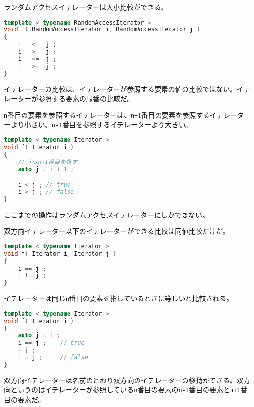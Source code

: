 ランダムアクセスイテレーターは大小比較ができる。

\begin{lstlisting}[language={C++}]
template < typename RandomAccessIterator >
void f( RandomAccessIterator i, RandomAccessIterator j )
{
    i   <   j ;
    i   >   j ;
    i   <=  j ;
    i   >=  j ;
}
\end{lstlisting}

イテレーターの比較は、イテレーターが参照する要素の値の比較ではない。イテレーターが参照する要素の順番の比較だ。

\texttt{n}番目の要素を参照するイテレーターは、\texttt{n+1}番目の要素を参照するイテレーターより小さい。\texttt{n-1}番目を参照するイテレーターより大きい。

\begin{lstlisting}[language={C++}]
template < typename Iterator >
void f( Iterator i )
{
    // jはn+1番目を指す
    auto j = i + 1 ;

    i < j ; // true
    i > j ; // false
}
\end{lstlisting}

ここまでの操作はランダムアクセスイテレーターにしかできない。

双方向イテレーター以下のイテレーターができる比較は同値比較だけだ。

\begin{lstlisting}[language={C++}]
template < typename Iterator >
void f( Iterator i, Iterator j )
{
    i == j ;
    i != j ;
}
\end{lstlisting}

イテレーターは同じ\texttt{n}番目の要素を指しているときに等しいと比較される。

\begin{lstlisting}[language={C++}]
template < typename Iterator >
void f( Iterator i )
{
    auto j = i ;
    i == j ;    // true
    ++j ;
    i = j ;     // false
}
\end{lstlisting}


双方向イテレーターは名前のとおり双方向のイテレーターの移動ができる。双方向というのはイテレーターが参照している\texttt{n}番目の要素の\texttt{n-1}番目の要素と\texttt{n+1}番目の要素だ。

